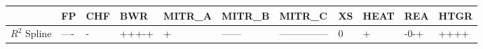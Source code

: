 \begin{tabular}{lllllllllll}
\toprule
 & FP & CHF & BWR & MITR_A & MITR_B & MITR_C & XS & HEAT & REA & HTGR \\
\midrule
$R^2$ Spline & ---- & - & +++-+ & + & ------ & --------------- & 0 & + & -0-+ & ++++ \\
\bottomrule
\end{tabular}
